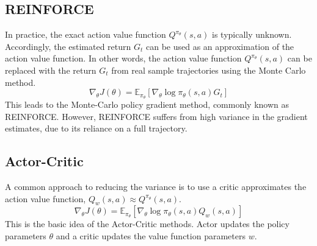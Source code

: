 \subsection{REINFORCE}

In practice, the exact action value function $Q^{\pi_\theta} (s, a)$ is typically unknown.
Accordingly, the estimated return $G_t$ can be used as an approximation of the action value function.
In other words, the action value function $Q^{\pi_\theta} (s, a)$ can be replaced with the return $G_t$ from real sample trajectories using the Monte Carlo method.
\begin{equation}
  \nabla_\theta J(\theta) = \mathbb{E}_{\pi_\theta}[\nabla_\theta \log \pi_\theta(s, a) G_t]
\end{equation}
This leads to the Monte-Carlo policy gradient method, commonly known as REINFORCE.
However, REINFORCE suffers from high variance in the gradient estimates, due to its reliance on a full trajectory.

\subsection{Actor-Critic}

A common approach to reducing the variance is to use a critic approximates the action value function, $Q_w(s, a) \approx Q^{\pi_\theta}(s, a)$.
\begin{equation}
  \nabla_\theta J(\theta) = \mathbb{E}_{\pi_\theta} [\nabla_\theta \log \pi_\theta(s, a) Q_w(s, a)]
\end{equation}
This is the basic idea of the Actor-Critic methods.
Actor updates the policy parameters $\theta$ and a critic updates the value function parameters $w$.

